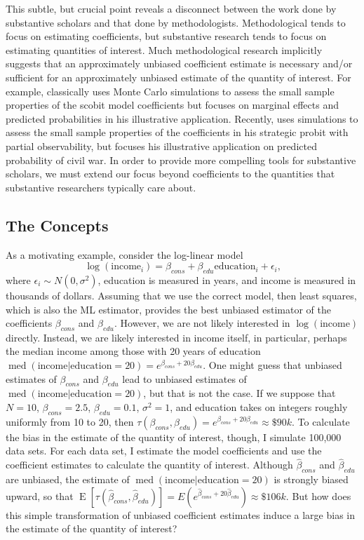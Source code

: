 \documentclass[12pt]{article}
\DeclareMathOperator{\med}{med}
\DeclareMathOperator*{\E}{\text{E}}
\begin{document}
This subtle, but crucial point reveals a disconnect between the work done by substantive scholars and that done by methodologists. 
Methodological tends to focus on estimating coefficients, but substantive research tends to focus on estimating quantities of interest. 
Much methodological research implicitly suggests that an approximately unbiased coefficient estimate is necessary and/or sufficient for an approximately unbiased estimate of the quantity of interest. 
For example, \cite{Nagler1994} classically uses Monte Carlo simulations to assess the small sample properties of the scobit model coefficients but focuses on marginal effects and predicted probabilities in his illustrative application. 
Recently, \cite{Nieman2015} uses simulations to assess the small sample properties of the coefficients in his strategic probit with partial observability, but focuses his illustrative application on predicted probability of civil war. 
In order to provide more compelling tools for substantive scholars, we must extend our focus beyond coefficients to the quantities that substantive researchers typically care about.

\subsection*{The Concepts}

As a motivating example, consider the log-linear model 
\begin{equation}
\log (\text{income}_i) = \beta_{cons} + \beta_{edu} \text{education}_i + \epsilon_i \text{,}\nonumber
\end{equation}
where $\epsilon_i \sim N(0, \sigma^2)$, education is measured in years, and income is measured in thousands of dollars. 
Assuming that we use the correct model, then least squares, which is also the ML estimator, provides the best unbiased estimator of the coefficients $\beta_{cons}$ and $\beta_{edu}$. 
However, we are not likely interested in $\log(\text{income})$ directly. Instead, we are likely interested in income itself, in particular, perhaps the median income among those with 20 years of education $\med(\text{income} | \text{education} = 20) = e^{\beta_{cons} + 20\beta_{edu}}$. 
One might guess that unbiased estimates of $\beta_{cons}$ and $\beta_{edu}$ lead to unbiased estimates of $\med(\text{income} | \text{education} = 20)$, but that is not the case. 
If we suppose that $N = 10$, $\beta_{cons} = 2.5$, $\beta_{edu} = 0.1$, $\sigma^2 = 1$, and education takes on integers roughly uniformly from 10 to 20, then $\tau(\beta_{cons}, \beta_{edu}) = e^{\beta_{cons} + 20\beta_{edu}} \approx \$90k$. 
To calculate the bias in the estimate of the quantity of interest, though, I simulate 100,000 data sets.
For each data set, I estimate the model coefficients and use the coefficient estimates to calculate the quantity of interest. 
Although $\hat{\beta}_{cons}$ and $\hat{\beta}_{edu}$ are unbiased, the estimate of $\med(\text{income} | \text{education} = 20)$ is strongly biased upward, so that $\E[\tau(\hat{\beta}_{cons}, \hat{\beta}_{edu})] = E(e^{\hat{\beta}_{cons} + 20\hat{\beta}_{edu}}) \approx \$106k$.
But how does this simple transformation of unbiased coefficient estimates induce a large bias in the estimate of the quantity of interest?
\end{document}
